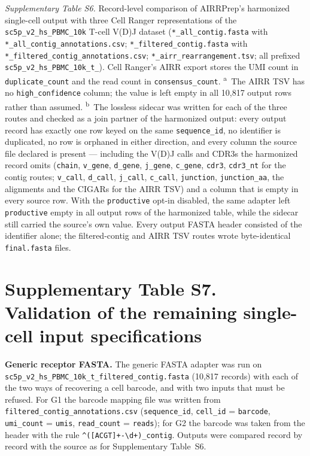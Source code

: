\documentclass[11pt]{article}
\begin{document}
{\small\textit{Supplementary Table S6.} Record-level comparison of AIRRPrep's
harmonized single-cell output with three Cell Ranger representations of the
\texttt{sc5p\_v2\_hs\_PBMC\_10k} T-cell V(D)J dataset
(\texttt{*\_all\_contig.fasta} with \texttt{*\_all\_contig\_annotations.csv};
\texttt{*\_filtered\_contig.fasta} with
\texttt{*\_filtered\_contig\_annotations.csv}; \texttt{*\_airr\_rearrangement.tsv};
all prefixed \texttt{sc5p\_v2\_hs\_PBMC\_10k\_t\_}). Cell Ranger's AIRR export
stores the UMI count in \texttt{duplicate\_count} and the read count in
\texttt{consensus\_count}. \textsuperscript{a}~The AIRR TSV has no
\texttt{high\_confidence} column; the value is left empty in all 10,817 output
rows rather than assumed. \textsuperscript{b}~The lossless sidecar was written
for each of the three routes and checked as a join partner of the harmonized
output: every output record has exactly one row keyed on the same
\texttt{sequence\_id}, no identifier is duplicated, no row is orphaned in
either direction, and every column the source file declared is present ---
including the V(D)J calls and CDR3s the harmonized record omits
(\texttt{chain}, \texttt{v\_gene}, \texttt{d\_gene}, \texttt{j\_gene},
\texttt{c\_gene}, \texttt{cdr3}, \texttt{cdr3\_nt} for the contig routes;
\texttt{v\_call}, \texttt{d\_call}, \texttt{j\_call}, \texttt{c\_call},
\texttt{junction}, \texttt{junction\_aa}, the alignments and the CIGARs for the
AIRR TSV) and a column that is empty in every source row. With the
\texttt{productive} opt-in disabled, the same adapter left \texttt{productive}
empty in all output rows of the harmonized table, while the sidecar still
carried the source's own value. Every output FASTA header consisted of the
identifier alone; the filtered-contig and AIRR TSV routes wrote byte-identical
\texttt{final.fasta} files.\par}


\clearpage

\section*{Supplementary Table S7. Validation of the remaining single-cell input specifications}

\textbf{Generic receptor FASTA.} The generic FASTA adapter was run on
\texttt{sc5p\_v2\_hs\_PBMC\_10k\_t\_filtered\_contig.fasta} (10,817 records) with
each of the two ways of recovering a cell barcode, and with two inputs that must
be refused. For G1 the barcode mapping file was written from
\texttt{filtered\_contig\_annotations.csv} (\texttt{sequence\_id},
\texttt{cell\_id} = \texttt{barcode}, \texttt{umi\_count} = \texttt{umis},
\texttt{read\_count} = \texttt{reads}); for G2 the barcode was taken from the
header with the rule \verb|^([ACGT]+-\d+)_contig|. Outputs were compared record
by record with the source as for Supplementary Table~S6.
\end{document}
